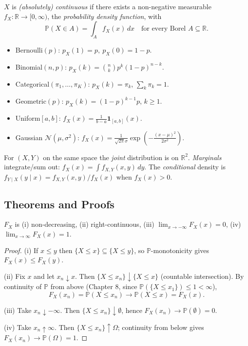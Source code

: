 \begin{definition}
$X$ is \emph{(absolutely) continuous} if there exists a non-negative measurable $f_X : \mathbb{R} \to [0,\infty)$, the \emph{probability density function}, with
\[
\mathbb{P}(X \in A) = \int_A f_X(x)\,dx \quad \text{for every Borel } A \subseteq \mathbb{R}.
\]
\end{definition}

\begin{example}
\begin{itemize}
\item Bernoulli$(p)$: $p_X(1)=p,\ p_X(0)=1-p$.
\item Binomial$(n,p)$: $p_X(k) = \binom{n}{k} p^k (1-p)^{n-k}$.
\item Categorical$(\pi_1,\dots,\pi_K)$: $p_X(k)=\pi_k$, $\sum_k \pi_k = 1$.
\item Geometric$(p)$: $p_X(k) = (1-p)^{k-1} p$, $k \geq 1$.
\item Uniform$[a,b]$: $f_X(x) = \tfrac{1}{b-a}\mathbf{1}_{[a,b]}(x)$.
\item Gaussian $\mathcal{N}(\mu,\sigma^2)$: $f_X(x) = \tfrac{1}{\sqrt{2\pi}\sigma} \exp\!\left(-\tfrac{(x-\mu)^2}{2\sigma^2}\right)$.
\end{itemize}
\end{example}

\begin{definition}
For $(X,Y)$ on the same space the \emph{joint} distribution is on $\mathbb{R}^2$. \emph{Marginals} integrate/sum out: $f_X(x) = \int f_{X,Y}(x,y)\, dy$. The \emph{conditional} density is $f_{Y\mid X}(y\mid x) = f_{X,Y}(x,y)/f_X(x)$ when $f_X(x) > 0$.
\end{definition}

\subsection*{Theorems and Proofs}

\begin{theorem}
$F_X$ is (i) non-decreasing, (ii) right-continuous, (iii) $\lim_{x\to -\infty} F_X(x) = 0$, (iv) $\lim_{x\to\infty} F_X(x) = 1$.
\end{theorem}

\begin{proof}
(i) If $x \leq y$ then $\{X \leq x\} \subseteq \{X \leq y\}$, so $\mathbb{P}$-monotonicity gives $F_X(x) \leq F_X(y)$.

(ii) Fix $x$ and let $x_n \downarrow x$. Then $\{X \leq x_n\} \downarrow \{X \leq x\}$ (countable intersection). By continuity of $\mathbb{P}$ from above (Chapter 8, since $\mathbb{P}(\{X\leq x_1\}) \leq 1 < \infty$),
\[
F_X(x_n) = \mathbb{P}(X \leq x_n) \to \mathbb{P}(X \leq x) = F_X(x).
\]

(iii) Take $x_n \downarrow -\infty$. Then $\{X \leq x_n\} \downarrow \emptyset$, hence $F_X(x_n) \to \mathbb{P}(\emptyset) = 0$.

(iv) Take $x_n \uparrow \infty$. Then $\{X \leq x_n\} \uparrow \Omega$; continuity from below gives $F_X(x_n) \to \mathbb{P}(\Omega) = 1$.
\end{proof}

